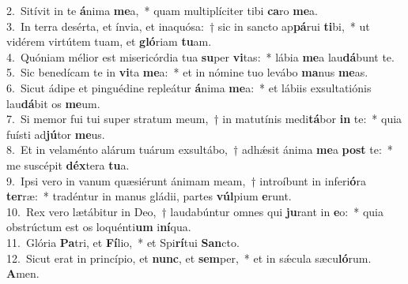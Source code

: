 {2.~}Sitívit in te \textbf{á}nima \textbf{me}a,~* quam multiplíciter tibi \textbf{ca}ro \textbf{me}a.\\
{3.~}In terra desérta, et ínvia, et inaquósa:~† sic in sancto ap\textbf{pá}rui \textbf{ti}bi,~* ut vidérem virtútem tuam, et \textbf{gló}riam \textbf{tu}am.\\
{4.~}Quóniam mélior est misericórdia tua \textbf{su}per \textbf{vi}tas:~* lábia \textbf{me}a lau\textbf{dá}bunt te.\\
{5.~}Sic benedícam te in \textbf{vi}ta \textbf{me}a:~* et in nómine tuo levábo \textbf{ma}nus \textbf{me}as.\\
{6.~}Sicut ádipe et pinguédine repleátur \textbf{á}nima \textbf{me}a:~* et lábiis exsultatiónis lau\textbf{dá}bit os \textbf{me}um.\\
{7.~}Si memor fui tui super stratum meum,~† in matutínis medi\textbf{tá}bor \textbf{in} te:~* quia fuísti ad\textbf{jú}tor \textbf{me}us.\\
{8.~}Et in velaménto alárum tuárum exsultábo,~† adhǽsit ánima \textbf{me}a \textbf{post} te:~* me suscépit \textbf{déx}tera \textbf{tu}a.\\
{9.~}Ipsi vero in vanum quæsiérunt ánimam meam,~† introíbunt in inferi\textbf{ó}ra \textbf{ter}ræ:~* tradéntur in manus gládii, partes \textbf{vúl}pium \textbf{e}runt.\\
{10.~}Rex vero lætábitur in Deo,~† laudabúntur omnes qui \textbf{ju}rant in \textbf{e}o:~* quia obstrúctum est os loquénti\textbf{um} i\textbf{ní}qua.\\
{11.~}Glória \textbf{Pa}tri, et \textbf{Fí}lio,~* et Spi\textbf{rí}tui \textbf{San}cto.\\
{12.~}Sicut erat in princípio, et \textbf{nunc}, et \textbf{sem}per,~* et in sǽcula sæcu\textbf{ló}rum. \textbf{A}men.\\
